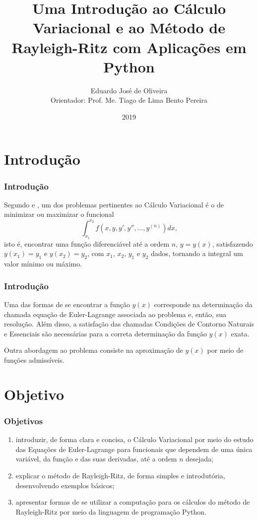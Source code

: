 \documentclass{beamer}
\title[Cálculo Variacional e o Método de Rayleigh-Ritz]{Uma Introdução ao Cálculo Variacional e ao Método de Rayleigh-Ritz com Aplicações em Python}
\author[Eduardo José de Oliveira]{
	Eduardo José de Oliveira\\
	Orientador: Prof. Me. Tiago de Lima Bento Pereira
}
\institute[Universidade Estadual de Goiás]{
	UNIVERSIDADE ESTADUAL DE GOIÁS\\
  	Câmpus Anápolis de Ciências Exatas e Tecnológicas Henrique Santillo \\
  	Matemática
}
\date[2019]{2019}
\begin{document}
	\begin{frame}[plain]
	  \titlepage
	\end{frame}

	\section{Introdução}
	\begin{frame}
		\frametitle{Introdução}
		
		\justify
		Segundo  e , um dos problemas pertinentes ao Cálculo Variacional é o de minimizar ou maximizar o funcional
		$$
			\int_{x_1}^{x_2} f(x, y, y', y'', \dots, y^{(n)})dx\text{,}
		$$
		isto é, encontrar uma função diferenciável até a ordem $n$, $y=y(x)$, satisfazendo $y(x_1)=y_1$ e $y(x_2)=y_2$, com $x_1$, $x_2$, $y_1$ e $y_2$ dados, tornando a integral um valor mínimo ou máximo.
	\end{frame}
	
	\begin{frame}
		\frametitle{Introdução}
		\justify

		Uma das formas de se encontrar a função $y(x)$ corresponde na determinação da chamada equação de Euler-Lagrange associada ao problema e, então, sua resolução. Além disso, a satisfação das chamadas Condições de Contorno Naturais e Essenciais são necessárias para a correta determinação da função $y(x)$ exata.
		\vspace{10pt}
		\pause
		
		Outra abordagem ao problema consiste na aproximação de $y(x)$ por meio de funções admissíveis.
	\end{frame}
	
	\section{Objetivo}
	\begin{frame}
		\frametitle{Objetivos}
	
		\begin{enumerate}
			\justifying
			\item introduzir, de forma clara e concisa, o Cálculo Variacional por meio do estudo das Equações de Euler-Lagrange para funcionais que dependem de uma única variável, da função e das suas derivadas, até a ordem $n$ desejada;
			
			\item explicar o método de Rayleigh-Ritz, de forma simples e introdutória, desenvolvendo exemplos básicos;
			
			\item apresentar formas de se utilizar a computação para os cálculos do método de Rayleigh-Ritz por meio da linguagem de programação Python.
		\end{enumerate}
	\end{frame}
\end{document}

